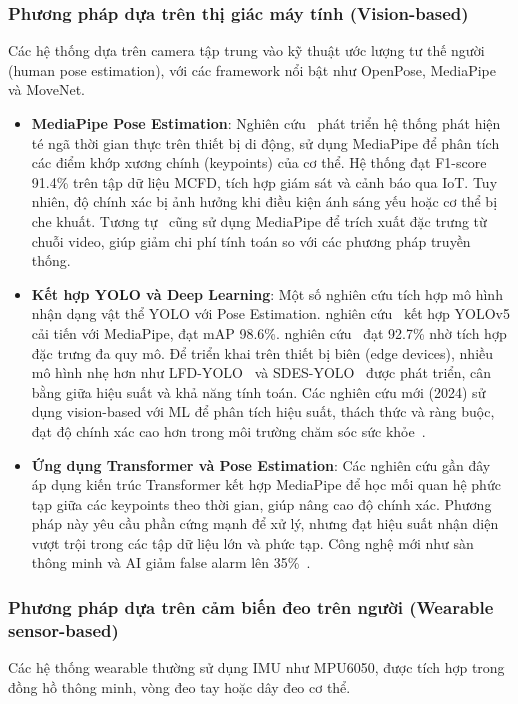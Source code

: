\subsubsection{Phương pháp dựa trên thị giác máy tính (Vision-based)}
Các hệ thống dựa trên camera tập trung vào kỹ thuật ước lượng tư thế người (human pose estimation), với các framework nổi bật như OpenPose, MediaPipe và MoveNet. 

\begin{itemize}
    \item \textbf{MediaPipe Pose Estimation}: Nghiên cứu~\cite{bugarin2022} phát triển hệ thống phát hiện té ngã thời gian thực trên thiết bị di động, sử dụng MediaPipe để phân tích các điểm khớp xương chính (keypoints) của cơ thể. Hệ thống đạt F1-score 91.4\% trên tập dữ liệu MCFD, tích hợp giám sát và cảnh báo qua IoT. Tuy nhiên, độ chính xác bị ảnh hưởng khi điều kiện ánh sáng yếu hoặc cơ thể bị che khuất. Tương tự~\cite{saraswat2024} cũng sử dụng MediaPipe để trích xuất đặc trưng từ chuỗi video, giúp giảm chi phí tính toán so với các phương pháp truyền thống.  
    \item \textbf{Kết hợp YOLO và Deep Learning}: Một số nghiên cứu tích hợp mô hình nhận dạng vật thể YOLO với Pose Estimation. nghiên cứu~\cite{han2024} kết hợp YOLOv5 cải tiến với MediaPipe, đạt mAP 98.6\%. nghiên cứu~\cite{chen2022} đạt 92.7\% nhờ tích hợp đặc trưng đa quy mô. Để triển khai trên thiết bị biên (edge devices), nhiều mô hình nhẹ hơn như LFD-YOLO~\cite{lfdyolo2025} và SDES-YOLO~\cite{sdesyolo2025} được phát triển, cân bằng giữa hiệu suất và khả năng tính toán. Các nghiên cứu mới (2024) sử dụng vision-based với ML để phân tích hiệu suất, thách thức và ràng buộc, đạt độ chính xác cao hơn trong môi trường chăm sóc sức khỏe~\cite{mlvision2024}.
    \item \textbf{Ứng dụng Transformer và Pose Estimation}: Các nghiên cứu gần đây~\cite{stylios2024, zhang2022, pmc2024} áp dụng kiến trúc Transformer kết hợp MediaPipe để học mối quan hệ phức tạp giữa các keypoints theo thời gian, giúp nâng cao độ chính xác. Phương pháp này yêu cầu phần cứng mạnh để xử lý, nhưng đạt hiệu suất nhận diện vượt trội trong các tập dữ liệu lớn và phức tạp. Công nghệ mới như sàn thông minh và AI giảm false alarm lên 35\%~\cite{smartfloor2024}.
\end{itemize}

\subsubsection{Phương pháp dựa trên cảm biến đeo trên người (Wearable sensor-based)}
Các hệ thống wearable thường sử dụng IMU như MPU6050, được tích hợp trong đồng hồ thông minh, vòng đeo tay hoặc dây đeo cơ thể. 

